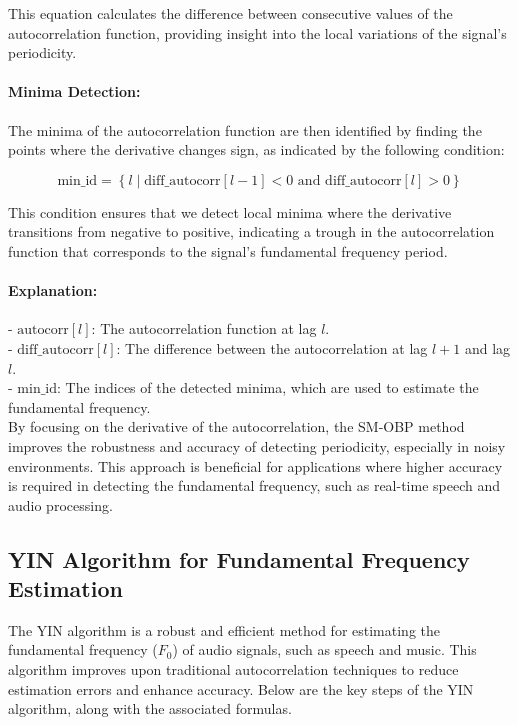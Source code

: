 \documentclass{ieeeaccess}
\begin{document}
This equation calculates the difference between consecutive values of the autocorrelation function, providing insight into the local variations of the signal's periodicity.

\paragraph{Minima Detection:}
The minima of the autocorrelation function are then identified by finding the points where the derivative changes sign, as indicated by the following condition:

\begin{equation}
\text{min\_id} = \left\{ l \mid \text{diff\_autocorr}[l-1] < 0 \text{ and }
 \text{diff\_autocorr}[l] > 0 \right\}
\label{eq:minima_detection}
\end{equation}

This condition ensures that we detect local minima where the derivative transitions from negative to positive, indicating a trough in the autocorrelation function that corresponds to the signal's fundamental frequency period.

\paragraph{Explanation:}
- \( \text{autocorr}[l] \): The autocorrelation function at lag \( l \).\\
- \( \text{diff\_autocorr}[l] \): The difference between the autocorrelation at lag \( l+1 \) and lag \( l \).\\
- \( \text{min\_id} \): The indices of the detected minima, which are used to estimate the fundamental frequency.\\
By focusing on the derivative of the autocorrelation, the SM-OBP method improves the robustness and accuracy of detecting periodicity, especially in noisy environments. This approach is beneficial for applications where higher accuracy is required in detecting the fundamental frequency, such as real-time speech and audio processing.

\subsection{YIN Algorithm for Fundamental Frequency Estimation}
The YIN algorithm is a robust and efficient method for estimating the fundamental frequency (\( F_0 \)) of audio signals, such as speech and music. This algorithm improves upon traditional autocorrelation techniques to reduce estimation errors and enhance accuracy. Below are the key steps of the YIN algorithm, along with the associated formulas.
\end{document}
